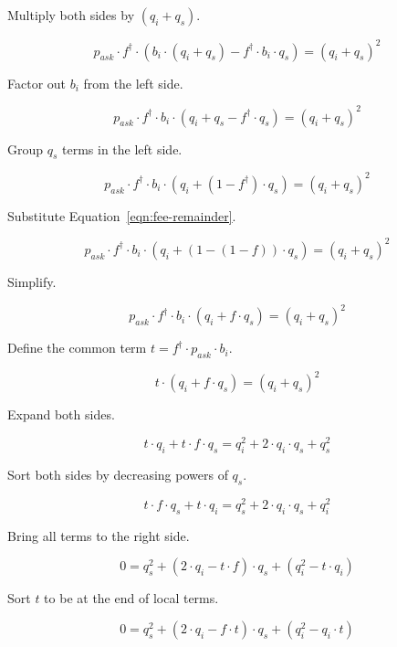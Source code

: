 Multiply both sides by $(q_i + q_s)$.

\begin{equation*}
	p_{ask} \cdot f^{\dagger} \cdot
	(b_i \cdot (q_i + q_s) - f^{\dagger} \cdot b_i \cdot q_s) = {(q_i + q_s)}^2
\end{equation*}

Factor out $b_i$ from the left side.

\begin{equation*}
	p_{ask} \cdot f^{\dagger} \cdot b_i \cdot
	(q_i + q_s - f^{\dagger} \cdot q_s) = {(q_i + q_s)}^2
\end{equation*}

Group $q_s$ terms in the left side.

\begin{equation*}
	p_{ask} \cdot f^{\dagger} \cdot b_i \cdot
	(q_i + (1 - f^{\dagger}) \cdot q_s) = {(q_i + q_s)}^2
\end{equation*}

Substitute Equation~\ref{eqn:fee-remainder}.

\begin{equation*}
	p_{ask} \cdot f^{\dagger} \cdot b_i \cdot
	(q_i + (1 - (1 - f)) \cdot q_s) = {(q_i + q_s)}^2
\end{equation*}

Simplify.

\begin{equation*}
	p_{ask} \cdot f^{\dagger} \cdot b_i \cdot (q_i + f \cdot q_s) = {(q_i + q_s)}^2
\end{equation*}

Define the common term $t = f^{\dagger} \cdot p_{ask} \cdot b_i$.

\begin{equation*}
	t \cdot (q_i + f \cdot q_s) = {(q_i + q_s)}^2
\end{equation*}

Expand both sides.

\begin{equation*}
	t \cdot q_i + t \cdot f \cdot q_s = q_i^2 + 2 \cdot q_i \cdot q_s + q_s^2
\end{equation*}

Sort both sides by decreasing powers of $q_s$.

\begin{equation*}
	t \cdot f \cdot q_s + t \cdot q_i = q_s^2 + 2 \cdot q_i \cdot q_s + q_i^2
\end{equation*}

Bring all terms to the right side.

\begin{equation*}
	0 = q_s^2 + (2 \cdot q_i - t \cdot f) \cdot q_s + (q_i^2 - t \cdot q_i)
\end{equation*}

Sort $t$ to be at the end of local terms.

\begin{equation*}
	0 = q_s^2 + (2 \cdot q_i - f \cdot t) \cdot q_s + (q_i^2 - q_i \cdot t)
\end{equation*}
